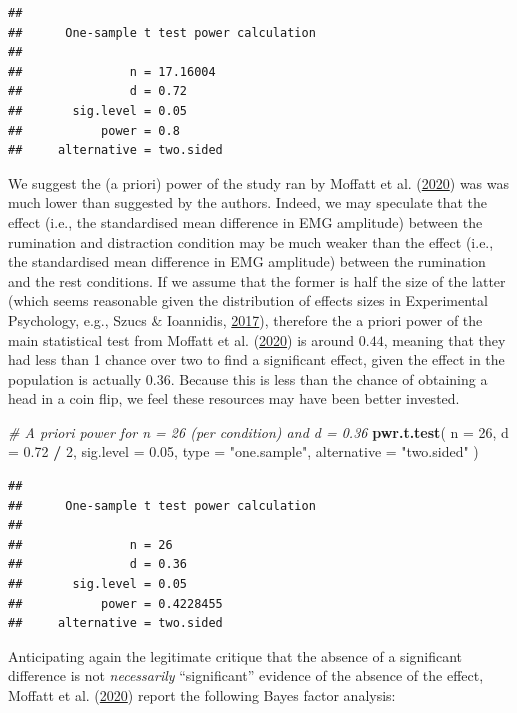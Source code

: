 \documentclass[
  english,
  man,floatsintext]{apa6}
\newenvironment{Shaded}{\begin{snugshade}}{\end{snugshade}}
\newcommand{\CommentTok}[1]{\textcolor[rgb]{0.56,0.35,0.01}{\textit{#1}}}
\newcommand{\DataTypeTok}[1]{\textcolor[rgb]{0.13,0.29,0.53}{#1}}
\newcommand{\DecValTok}[1]{\textcolor[rgb]{0.00,0.00,0.81}{#1}}
\newcommand{\FloatTok}[1]{\textcolor[rgb]{0.00,0.00,0.81}{#1}}
\newcommand{\KeywordTok}[1]{\textcolor[rgb]{0.13,0.29,0.53}{\textbf{#1}}}
\newcommand{\NormalTok}[1]{#1}
\newcommand{\OperatorTok}[1]{\textcolor[rgb]{0.81,0.36,0.00}{\textbf{#1}}}
\newcommand{\StringTok}[1]{\textcolor[rgb]{0.31,0.60,0.02}{#1}}
\begin{document}
\begin{verbatim}
## 
##      One-sample t test power calculation 
## 
##               n = 17.16004
##               d = 0.72
##       sig.level = 0.05
##           power = 0.8
##     alternative = two.sided
\end{verbatim}

We suggest the (a priori) power of the study ran by Moffatt et al. (\protect\hyperlink{ref-moffatt_inner_2020}{2020}) was was much lower than suggested by the authors. Indeed, we may speculate that the effect (i.e., the standardised mean difference in EMG amplitude) between the rumination and distraction condition may be much weaker than the effect (i.e., the standardised mean difference in EMG amplitude) between the rumination and the rest conditions. If we assume that the former is half the size of the latter (which seems reasonable given the distribution of effects sizes in Experimental Psychology, e.g., Szucs \& Ioannidis, \protect\hyperlink{ref-szucs_empirical_2017}{2017}), therefore the a priori power of the main statistical test from Moffatt et al. (\protect\hyperlink{ref-moffatt_inner_2020}{2020}) is around \(0.44\), meaning that they had less than 1 chance over two to find a significant effect, given the effect in the population is actually \(0.36\). Because this is less than the chance of obtaining a head in a coin flip, we feel these resources may have been better invested.

\begin{Shaded}
\begin{Highlighting}[]
\CommentTok{\# A priori power for n = 26 (per condition) and d = 0.36}
\KeywordTok{pwr.t.test}\NormalTok{(}
  \DataTypeTok{n =} \DecValTok{26}\NormalTok{, }\DataTypeTok{d =} \FloatTok{0.72} \OperatorTok{/}\StringTok{ }\DecValTok{2}\NormalTok{, }\DataTypeTok{sig.level =} \FloatTok{0.05}\NormalTok{,}
  \DataTypeTok{type =} \StringTok{"one.sample"}\NormalTok{, }\DataTypeTok{alternative =} \StringTok{"two.sided"}
\NormalTok{  )}
\end{Highlighting}
\end{Shaded}

\begin{verbatim}
## 
##      One-sample t test power calculation 
## 
##               n = 26
##               d = 0.36
##       sig.level = 0.05
##           power = 0.4228455
##     alternative = two.sided
\end{verbatim}

Anticipating again the legitimate critique that the absence of a significant difference is not \emph{necessarily} ``significant'' evidence of the absence of the effect, Moffatt et al. (\protect\hyperlink{ref-moffatt_inner_2020}{2020}) report the following Bayes factor analysis:
\end{document}
